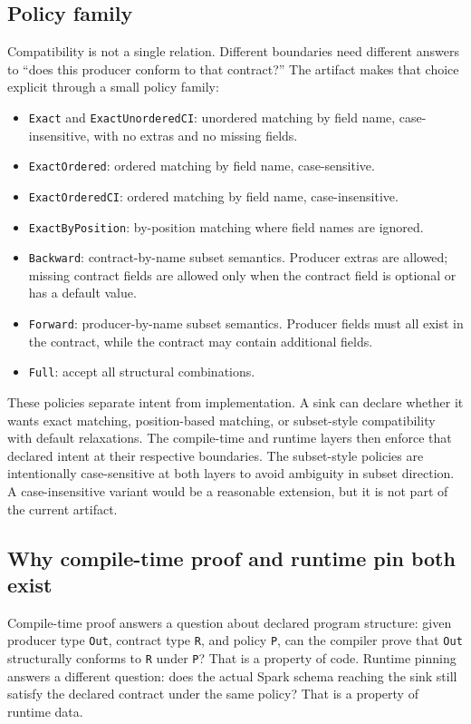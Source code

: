 \subsection{Policy family}

Compatibility is not a single relation. Different boundaries need different answers to ``does this producer conform to that contract?'' The artifact makes that choice explicit through a small policy family:

\begin{itemize}[leftmargin=1.5em]
  \item \texttt{Exact} and \texttt{ExactUnorderedCI}: unordered matching by field name, case-insensitive, with no extras and no missing fields.
  \item \texttt{ExactOrdered}: ordered matching by field name, case-sensitive.
  \item \texttt{ExactOrderedCI}: ordered matching by field name, case-insensitive.
  \item \texttt{ExactByPosition}: by-position matching where field names are ignored.
  \item \texttt{Backward}: contract-by-name subset semantics. Producer extras are allowed; missing contract fields are allowed only when the contract field is optional or has a default value.
  \item \texttt{Forward}: producer-by-name subset semantics. Producer fields must all exist in the contract, while the contract may contain additional fields.
  \item \texttt{Full}: accept all structural combinations.
\end{itemize}

These policies separate intent from implementation. A sink can declare whether it wants exact matching, position-based matching, or subset-style compatibility with default relaxations. The compile-time and runtime layers then enforce that declared intent at their respective boundaries.
The subset-style policies are intentionally case-sensitive at both layers to avoid ambiguity in subset direction. A case-insensitive variant would be a reasonable extension, but it is not part of the current artifact.

\subsection{Why compile-time proof and runtime pin both exist}

Compile-time proof answers a question about declared program structure: given producer type \texttt{Out}, contract type \texttt{R}, and policy \texttt{P}, can the compiler prove that \texttt{Out} structurally conforms to \texttt{R} under \texttt{P}? That is a property of code. Runtime pinning answers a different question: does the actual Spark schema reaching the sink still satisfy the declared contract under the same policy? That is a property of runtime data.

